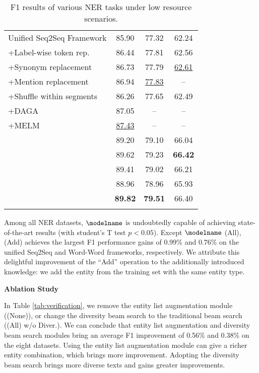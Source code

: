 \begin{table}[bt!]
{\begin{tabular}{lccc}
\midrule 
\midrule 
Unified Seq2Seq Framework &85.90  &77.32 &62.24 \\
\multicolumn{1}{l}{+Label-wise token rep.} &86.44 &77.81 &62.56 \\
\multicolumn{1}{l}{+Synonym replacement}&86.73 &77.79 &\underline{62.61} \\
\multicolumn{1}{l}{+Mention replacement} &86.94 &\underline{77.83} &-- \\
\multicolumn{1}{l}{+Shuffle within segments} &86.26 &77.65 &62.49 \\
\multicolumn{1}{l}{+DAGA} &87.05 &-- &-- \\
\multicolumn{1}{l}{+MELM} &\underline{87.43} &-- &-- \\
\rowcolor{gray!10}
\multicolumn{1}{l}{\textbf{+$\modelname$ (Delete)}} & 89.20 &79.10 &66.04 \\
\rowcolor{gray!10}
\multicolumn{1}{l}{\textbf{+$\modelname$ (Add)}} &89.62 &79.23 &\textbf{66.42} \\
\rowcolor{gray!10}
\multicolumn{1}{l}{\textbf{+$\modelname$ (Replace)}} &89.41 &79.02 &66.21 \\
\rowcolor{gray!10}
\multicolumn{1}{l}{\textbf{+$\modelname$ (Swap)}} &88.96 &78.96 &65.93 \\
\rowcolor{gray!10}
\multicolumn{1}{l}{\textbf{+$\modelname$ (All)}} &\textbf{89.82} &\textbf{79.51} &66.40 \\

\thickhline
\end{tabular}}
\caption{F1 results of various NER tasks under low resource scenarios.}
\label{tab:low-resource}
\vspace{-4mm}
\end{table}
Among all NER datasets, ${\modelname}$ is undoubtedly capable of achieving state-of-the-art results (with student's T test $p<0.05$). Except ${\modelname}$ (All), {\modelname} (Add) achieves the largest F1 performance gains of 0.99\% and 0.76\% on the unified Seq2Seq and Word-Word frameworks, respectively. We attribute this delightful improvement of the ``Add'' operation to the additionally introduced knowledge: we add the entity from the training set with the same entity type.

\noindent\textbf{Ablation Study}

In Table \ref{tab:verification}, we remove the entity list augmentation module (\modelname (None)), or change the diversity beam search to the traditional beam search (\modelname (All) w/o Diver.). We can conclude that entity list augmentation and diversity beam search modules bring an average F1 improvement of 0.56\% and 0.38\% on the eight datasets. Using the entity list augmentation module can give a richer entity combination, which brings more improvement. Adopting the diversity beam search brings more diverse texts and gains greater improvements.

